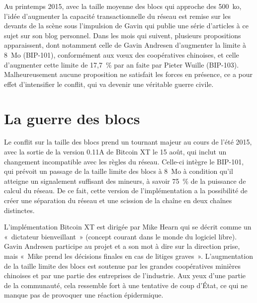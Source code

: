 Au printemps 2015, avec la taille moyenne des blocs qui approche des 500~ko, l'idée d'augmenter la capacité transactionnelle du réseau est remise sur les devants de la scène sous l'impulsion de Gavin qui publie une série d'articles à ce sujet sur son blog personnel. Dans les mois qui suivent, plusieurs propositions apparaissent, dont notamment celle de Gavin Andresen d'augmenter la limite à 8~Mo (BIP-101), conformément aux vœux des coopératives chinoises, et celle d'augmenter cette limite de 17,7~\% par an faite par Pieter Wuille (BIP-103). Malheureusement aucune proposition ne satisfait les forces en présence, ce a pour effet d'intensifier le conflit, qui va devenir une véritable guerre civile.

\section*{La guerre des blocs} %

Le conflit sur la taille des blocs prend un tournant majeur au cours de l'été 2015, avec la sortie de la version 0.11A de Bitcoin XT le 15 août, qui inclut un changement incompatible avec les règles du réseau. Celle-ci intègre le BIP-101, qui prévoit un passage de la taille limite des blocs à 8~Mo à condition qu'il atteigne un signalement suffisant des mineurs, à savoir 75~\% de la puissance de calcul du réseau. De ce fait, cette version de l'implémentation a la possibilité de créer une séparation du réseau et une scission de la chaîne en deux chaînes distinctes. 

L'implémentation Bitcoin XT est dirigée par Mike Hearn qui se décrit comme un «~dictateur bienveillant~» (concept courant dans le monde du logiciel libre). Gavin Andresen participe au projet et a son mot à dire sur la direction prise, mais «~Mike prend les décisions finales en cas de litiges graves~». L'augmentation de la taille limite des blocs est soutenue par les grandes coopératives minières chinoises et par une partie des entreprises de l'industrie. Aux yeux d'une partie de la communauté, cela ressemble fort à une tentative de coup d'État, ce qui ne manque pas de provoquer une réaction épidermique.

